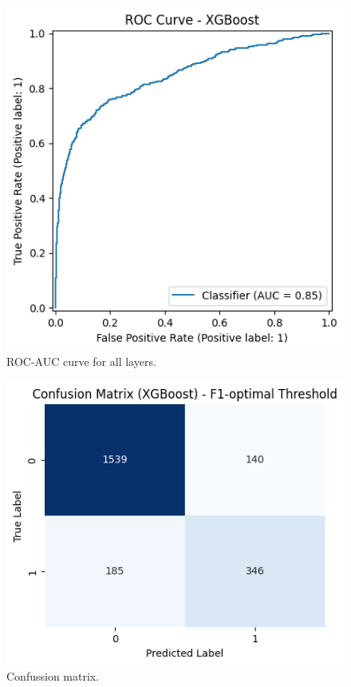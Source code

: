 \begin{figure}[htbp]
    \centerline{\includegraphics[width=\linewidth]{fig9.png}}
    \caption{ROC-AUC curve for all layers.}
    \label{fig:all-layers}
\end{figure}
\begin{figure}[htbp]
    \centerline{\includegraphics[width=\linewidth]{fig10.png}}
    \caption{Confussion matrix.}
    \label{fig:confusion-matrix}
\end{figure}

